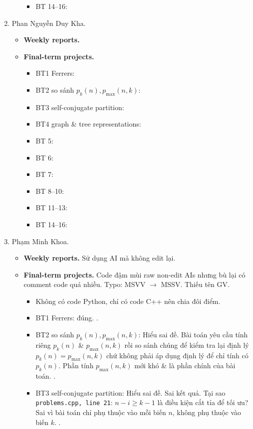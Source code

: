 \documentclass{article}
\begin{document}
\begin{enumerate}
\begin{itemize}
\begin{itemize}
            \item BT 14--16:
        \end{itemize}
    \end{itemize}
    \item {\sc Phan Nguyễn Duy Kha.}
    \begin{itemize}
        \item {\bf Weekly reports.}
        \item {\bf Final-term projects.}
        \begin{itemize}
            \item BT1 Ferrers:
            \item BT2 so sánh $p_k(n),p_{\max}(n,k)$:
            \item BT3 self-conjugate partition:
            \item BT4 graph \& tree representations:
            \item BT 5:
            \item BT 6:
            \item BT 7:
            \item BT 8--10:
            \item BT 11--13:
            \item BT 14--16:
        \end{itemize}
    \end{itemize}
    \item {\sc Phạm Minh Khoa.}
    \begin{itemize}
        \item {\bf Weekly reports.} Sử dụng AI mà không  edit lại.
        \item {\bf Final-term projects.} Code đậm mùi raw non-edit AIs nhưng bù lại có comment code quá nhiều. Typo: MSVV $\to$ MSSV. Thiếu tên GV.
        \begin{itemize}
            \item Không có code Python, chỉ có code C++ nên chia đôi điểm.
            \item BT1 Ferrers: đúng. .
            \item BT2 so sánh $p_k(n),p_{\max}(n,k)$: Hiểu sai đề. Bài toán yêu cầu tính riêng $p_k(n)$ \& $p_{\max}(n,k)$ rồi so sánh chúng để kiểm tra lại định lý $p_k(n) = p_{\max}(n,k)$ chứ không phải áp dụng định lý để chỉ tính có $p_k(n)$. Phần tính $p_{\max}(n,k)$ mới khó \& là phần chính  của bài toán. .
            \item BT3 self-conjugate partition: Hiểu sai đề. Sai kết quả. Tại sao {\tt problems.cpp, line 21}: $n - i\ge k - 1$ là điều kiện cắt tỉa để tối ưu? Sai vì bài toán chỉ phụ thuộc vào mỗi biến $n$, không phụ thuộc vào biến $k$. .

\end{itemize}
\end{itemize}
\end{enumerate}
\end{document}
